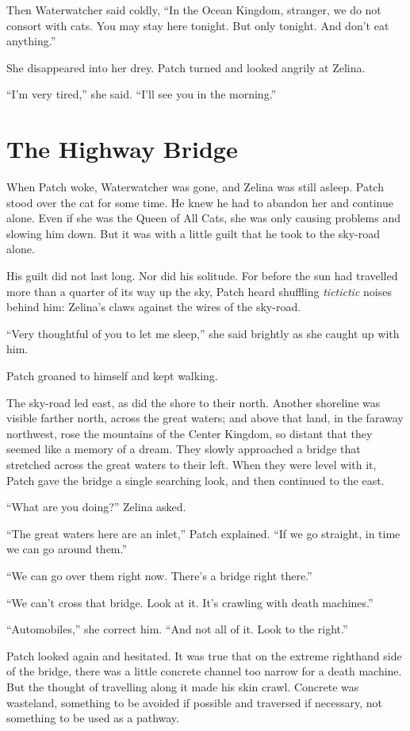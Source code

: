 \documentclass[ebook,oneside,openany,12pt]{memoir}
\begin{document}
Then Waterwatcher said coldly, “In the Ocean Kingdom, stranger, we do
not consort with cats. You may stay here tonight. But only
tonight. And don’t eat anything.”

She disappeared into her drey. Patch turned and looked angrily at
Zelina.

“I’m very tired,” she said. “I’ll see you in the morning.”


\section{The Highway Bridge}

When Patch woke, Waterwatcher was gone, and Zelina was still
asleep. Patch stood over the cat for some time. He knew he had to
abandon her and continue alone. Even if she was the Queen of All Cats,
she was only causing problems and slowing him down. But it was with a
little guilt that he took to the sky-road alone.

His guilt did not last long. Nor did his solitude. For before the sun
had travelled more than a quarter of its way up the sky, Patch heard
shuffling \emph{tictictic} noises behind him: Zelina’s claws against
the wires of the sky-road.

“Very thoughtful of you to let me sleep,” she said brightly as she
caught up with him.

Patch groaned to himself and kept walking.

The sky-road led east, as did the shore to their north. Another
shoreline was visible farther north, across the great waters; and
above that land, in the faraway northwest, rose the mountains of the
Center Kingdom, so distant that they seemed like a memory of a
dream. They slowly approached a bridge that stretched across the great
waters to their left. When they were level with it, Patch gave the
bridge a single searching look, and then continued to the east.

“What are you doing?” Zelina asked.

“The great waters here are an inlet,” Patch explained. “If we go
straight, in time we can go around them.”

“We can go over them right now. There’s a bridge right there.”

“We can’t cross that bridge. Look at it. It’s crawling with death
machines.”

“Automobiles,” she correct him. “And not all of it. Look to the
right.”

Patch looked again and hesitated. It was true that on the extreme
righthand side of the bridge, there was a little concrete channel too
narrow for a death machine. But the thought of travelling along it
made his skin crawl. Concrete was wasteland, something to be avoided
if possible and traversed if necessary, not something to be used as a
pathway.
\end{document}
